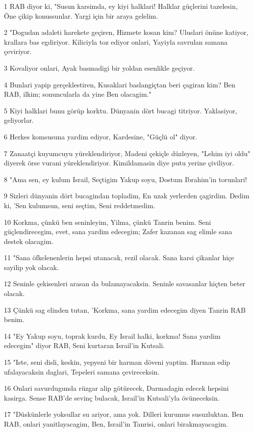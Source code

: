 \par 1 RAB diyor ki, "Susun karsimda, ey kiyi halklari! Halklar güçlerini tazelesin, Öne çikip konussunlar. Yargi için bir araya gelelim.
\par 2 "Dogudan adaleti harekete geçiren, Hizmete kosan kim? Uluslari önüne katiyor, krallara bas egdiriyor. Kiliciyla toz ediyor onlari, Yayiyla savrulan samana çeviriyor.
\par 3 Kovaliyor onlari, Ayak basmadigi bir yoldan esenlikle geçiyor.
\par 4 Bunlari yapip gerçeklestiren, Kusaklari baslangiçtan beri çagiran kim? Ben RAB, ilkim; sonuncularla da yine Ben olacagim."
\par 5 Kiyi halklari bunu görüp korktu. Dünyanin dört bucagi titriyor. Yaklasiyor, geliyorlar.
\par 6 Herkes komsusuna yardim ediyor, Kardesine, "Güçlü ol" diyor.
\par 7 Zanaatçi kuyumcuyu yüreklendiriyor, Madeni çekiçle düzleyen, "Lehim iyi oldu" diyerek örse vurani yüreklendiriyor. Kimildamasin diye putu yerine çiviliyor.
\par 8 "Ama sen, ey kulum Israil, Seçtigim Yakup soyu, Dostum Ibrahim'in torunlari!
\par 9 Sizleri dünyanin dört bucagindan topladim, En uzak yerlerden çagirdim. Dedim ki, 'Sen kulumsun, seni seçtim, Seni reddetmedim.
\par 10 Korkma, çünkü ben seninleyim, Yilma, çünkü Tanrin benim. Seni güçlendirecegim, evet, sana yardim edecegim; Zafer kazanan sag elimle sana destek olacagim.
\par 11 "Sana öfkelenenlerin hepsi utanacak, rezil olacak. Sana karsi çikanlar hiçe sayilip yok olacak.
\par 12 Seninle çekisenleri arasan da bulamayacaksin. Seninle savasanlar hiçten beter olacak.
\par 13 Çünkü sag elinden tutan, 'Korkma, sana yardim edecegim diyen Tanrin RAB benim.
\par 14 "Ey Yakup soyu, toprak kurdu, Ey Israil halki, korkma! Sana yardim edecegim" diyor RAB, Seni kurtaran Israil'in Kutsali.
\par 15 "Iste, seni disli, keskin, yepyeni bir harman döveni yaptim. Harman edip ufalayacaksin daglari, Tepeleri samana çevireceksin.
\par 16 Onlari savurdugunda rüzgar alip götürecek, Darmadagin edecek hepsini kasirga. Sense RAB'de sevinç bulacak, Israil'in Kutsali'yla övüneceksin.
\par 17 "Düskünlerle yoksullar su ariyor, ama yok. Dilleri kurumus susuzluktan. Ben RAB, onlari yanitlayacagim, Ben, Israil'in Tanrisi, onlari birakmayacagim.

